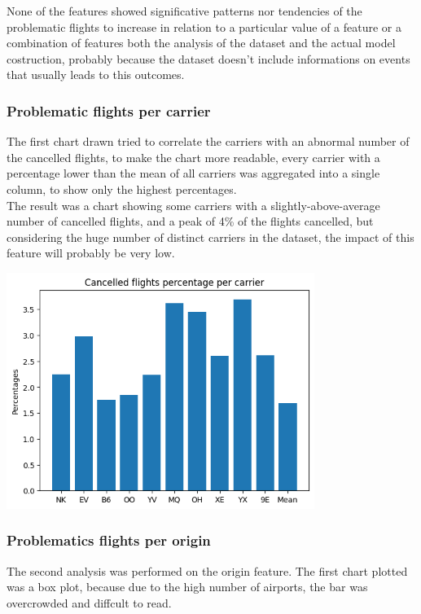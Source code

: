 \documentclass[
	letterpaper, %
	10pt, %
]{class}
\begin{document}
None of the features showed significative patterns nor tendencies of the problematic flights to increase in relation to a particular value of a feature or a combination of features both the analysis of the dataset and the actual model costruction, probably because the dataset doesn't include informations on events that usually leads to this outcomes.\\

\subsubsection{Problematic flights per carrier}
The first chart drawn tried to correlate the carriers with an abnormal number of the cancelled flights, to make the chart more readable, every carrier with a percentage lower than the mean of all carriers was aggregated into a single column, to show only the highest percentages.\\

The result was a chart showing some carriers with a slightly-above-average number of cancelled flights, and a peak of 4\% of the flights  cancelled, but considering the huge number of distinct carriers in the dataset, the impact of this feature will probably be very low.

\begin{center}
    \includegraphics[width=10cm]{../images/cancelled_per_carrier.png}
\end{center}

\subsubsection{Problematics flights per origin}
The second analysis was performed on the origin feature.
The first chart plotted was a box plot, because due to the high number of airports, the bar was overcrowded and diffcult to read.\\
\end{document}

